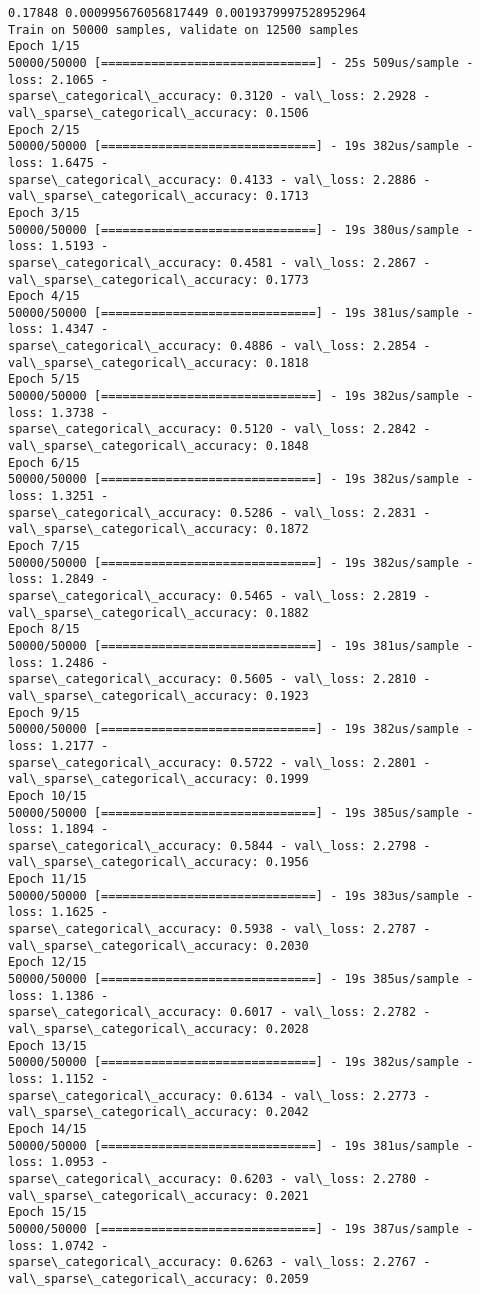 \documentclass[11pt]{article}
\begin{document}
    \begin{Verbatim}[commandchars=\\\{\}]
0.17848 0.000995676056817449 0.0019379997528952964
Train on 50000 samples, validate on 12500 samples
Epoch 1/15
50000/50000 [==============================] - 25s 509us/sample - loss: 2.1065 -
sparse\_categorical\_accuracy: 0.3120 - val\_loss: 2.2928 -
val\_sparse\_categorical\_accuracy: 0.1506
Epoch 2/15
50000/50000 [==============================] - 19s 382us/sample - loss: 1.6475 -
sparse\_categorical\_accuracy: 0.4133 - val\_loss: 2.2886 -
val\_sparse\_categorical\_accuracy: 0.1713
Epoch 3/15
50000/50000 [==============================] - 19s 380us/sample - loss: 1.5193 -
sparse\_categorical\_accuracy: 0.4581 - val\_loss: 2.2867 -
val\_sparse\_categorical\_accuracy: 0.1773
Epoch 4/15
50000/50000 [==============================] - 19s 381us/sample - loss: 1.4347 -
sparse\_categorical\_accuracy: 0.4886 - val\_loss: 2.2854 -
val\_sparse\_categorical\_accuracy: 0.1818
Epoch 5/15
50000/50000 [==============================] - 19s 382us/sample - loss: 1.3738 -
sparse\_categorical\_accuracy: 0.5120 - val\_loss: 2.2842 -
val\_sparse\_categorical\_accuracy: 0.1848
Epoch 6/15
50000/50000 [==============================] - 19s 382us/sample - loss: 1.3251 -
sparse\_categorical\_accuracy: 0.5286 - val\_loss: 2.2831 -
val\_sparse\_categorical\_accuracy: 0.1872
Epoch 7/15
50000/50000 [==============================] - 19s 382us/sample - loss: 1.2849 -
sparse\_categorical\_accuracy: 0.5465 - val\_loss: 2.2819 -
val\_sparse\_categorical\_accuracy: 0.1882
Epoch 8/15
50000/50000 [==============================] - 19s 381us/sample - loss: 1.2486 -
sparse\_categorical\_accuracy: 0.5605 - val\_loss: 2.2810 -
val\_sparse\_categorical\_accuracy: 0.1923
Epoch 9/15
50000/50000 [==============================] - 19s 382us/sample - loss: 1.2177 -
sparse\_categorical\_accuracy: 0.5722 - val\_loss: 2.2801 -
val\_sparse\_categorical\_accuracy: 0.1999
Epoch 10/15
50000/50000 [==============================] - 19s 385us/sample - loss: 1.1894 -
sparse\_categorical\_accuracy: 0.5844 - val\_loss: 2.2798 -
val\_sparse\_categorical\_accuracy: 0.1956
Epoch 11/15
50000/50000 [==============================] - 19s 383us/sample - loss: 1.1625 -
sparse\_categorical\_accuracy: 0.5938 - val\_loss: 2.2787 -
val\_sparse\_categorical\_accuracy: 0.2030
Epoch 12/15
50000/50000 [==============================] - 19s 385us/sample - loss: 1.1386 -
sparse\_categorical\_accuracy: 0.6017 - val\_loss: 2.2782 -
val\_sparse\_categorical\_accuracy: 0.2028
Epoch 13/15
50000/50000 [==============================] - 19s 382us/sample - loss: 1.1152 -
sparse\_categorical\_accuracy: 0.6134 - val\_loss: 2.2773 -
val\_sparse\_categorical\_accuracy: 0.2042
Epoch 14/15
50000/50000 [==============================] - 19s 381us/sample - loss: 1.0953 -
sparse\_categorical\_accuracy: 0.6203 - val\_loss: 2.2780 -
val\_sparse\_categorical\_accuracy: 0.2021
Epoch 15/15
50000/50000 [==============================] - 19s 387us/sample - loss: 1.0742 -
sparse\_categorical\_accuracy: 0.6263 - val\_loss: 2.2767 -
val\_sparse\_categorical\_accuracy: 0.2059
    \end{Verbatim}
\end{document}

